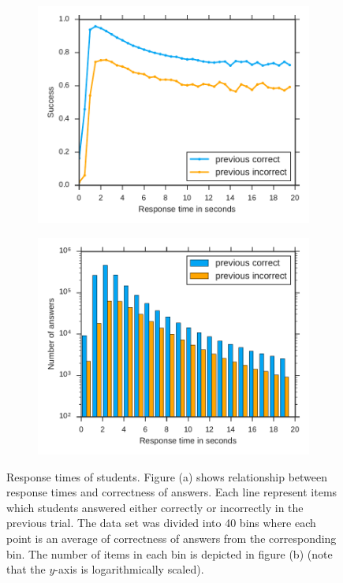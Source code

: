 \begin{figure}[htbp]
  \centering
  \begin{subfigure}{.49\textwidth}
    \centering
    \includegraphics[width=\textwidth]{img/response-times-averaged}
    \caption{}
    \label{fig:response-times-averaged}
  \end{subfigure}
  \begin{subfigure}{.49\textwidth}
    \centering
    \includegraphics[width=\textwidth]{img/response-times-hist}
    \caption{}
    \label{fig:response-times-hist}
  \end{subfigure}
  \caption{Response times of students. Figure (a) shows relationship between response times and correctness of answers. Each line represent items which students answered either correctly or incorrectly in the previous trial. The data set was divided into 40 bins where each point is an average of correctness of answers from the corresponding bin. The number of items in each bin is depicted in figure (b) (note that the $y$-axis is logarithmically scaled).}
  \label{fig:response-times}
\end{figure}

